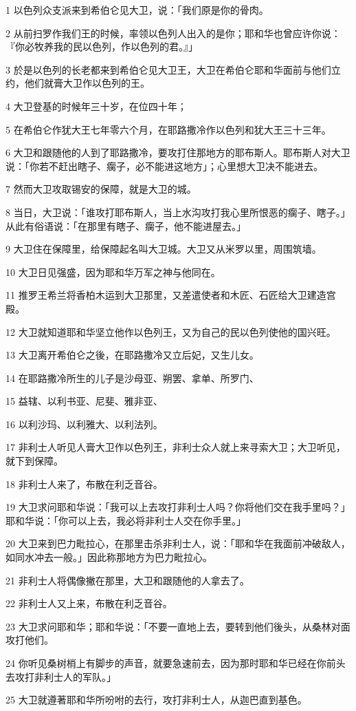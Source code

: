 \par 1 以色列众支派来到希伯仑见大卫，说：「我们原是你的骨肉。
\par 2 从前扫罗作我们王的时候，率领以色列人出入的是你；耶和华也曾应许你说：『你必牧养我的民以色列，作以色列的君。』」
\par 3 於是以色列的长老都来到希伯仑见大卫王，大卫在希伯仑耶和华面前与他们立约，他们就膏大卫作以色列的王。
\par 4 大卫登基的时候年三十岁，在位四十年；
\par 5 在希伯仑作犹大王七年零六个月，在耶路撒冷作以色列和犹大王三十三年。
\par 6 大卫和跟随他的人到了耶路撒冷，要攻打住那地方的耶布斯人。耶布斯人对大卫说：「你若不赶出瞎子、瘸子，必不能进这地方」；心里想大卫决不能进去。
\par 7 然而大卫攻取锡安的保障，就是大卫的城。
\par 8 当日，大卫说：「谁攻打耶布斯人，当上水沟攻打我心里所恨恶的瘸子、瞎子。」从此有俗语说：「在那里有瞎子、瘸子，他不能进屋去。」
\par 9 大卫住在保障里，给保障起名叫大卫城。大卫又从米罗以里，周围筑墙。
\par 10 大卫日见强盛，因为耶和华万军之神与他同在。
\par 11 推罗王希兰将香柏木运到大卫那里，又差遣使者和木匠、石匠给大卫建造宫殿。
\par 12 大卫就知道耶和华坚立他作以色列王，又为自己的民以色列使他的国兴旺。
\par 13 大卫离开希伯仑之後，在耶路撒冷又立后妃，又生儿女。
\par 14 在耶路撒冷所生的儿子是沙母亚、朔罢、拿单、所罗门、
\par 15 益辖、以利书亚、尼斐、雅非亚、
\par 16 以利沙玛、以利雅大、以利法列。
\par 17 非利士人听见人膏大卫作以色列王，非利士众人就上来寻索大卫；大卫听见，就下到保障。
\par 18 非利士人来了，布散在利乏音谷。
\par 19 大卫求问耶和华说：「我可以上去攻打非利士人吗？你将他们交在我手里吗？」耶和华说：「你可以上去，我必将非利士人交在你手里。」
\par 20 大卫来到巴力毗拉心，在那里击杀非利士人，说：「耶和华在我面前冲破敌人，如同水冲去一般。」因此称那地方为巴力毗拉心。
\par 21 非利士人将偶像撇在那里，大卫和跟随他的人拿去了。
\par 22 非利士人又上来，布散在利乏音谷。
\par 23 大卫求问耶和华；耶和华说：「不要一直地上去，要转到他们後头，从桑林对面攻打他们。
\par 24 你听见桑树梢上有脚步的声音，就要急速前去，因为那时耶和华已经在你前头去攻打非利士人的军队。」
\par 25 大卫就遵著耶和华所吩咐的去行，攻打非利士人，从迦巴直到基色。

